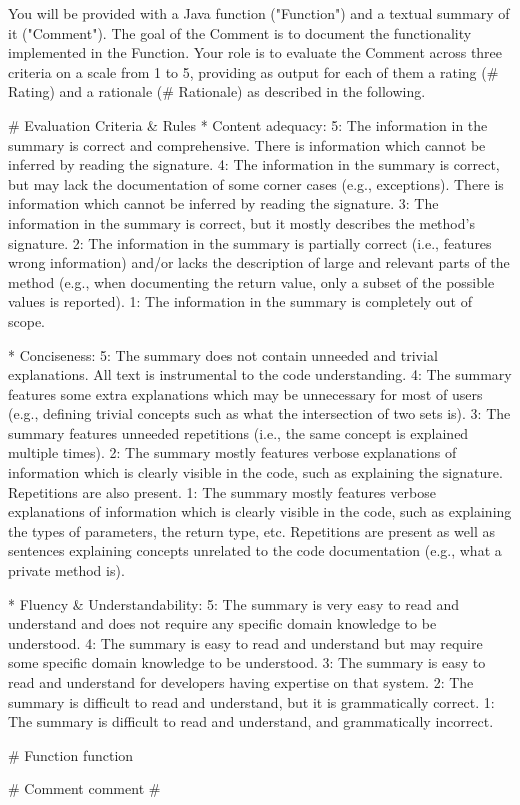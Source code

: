 You will be provided with a Java function ("Function") and a textual summary of it ("Comment"). The goal of the Comment is to document the functionality implemented in the Function. Your role is to evaluate the Comment across three criteria on a scale from 1 to 5, providing as output for each of them a rating (# Rating) and a rationale (# Rationale) as described in the following.

# Evaluation Criteria & Rules
* Content adequacy:
	5: The information in the summary is correct and comprehensive. There is information which cannot be inferred by reading the signature.
	4: The information in the summary is correct, but may lack the documentation of some corner cases (e.g., exceptions). There is information which cannot be inferred by reading the signature.
	3: The information in the summary is correct, but it mostly describes the method's signature.
	2: The information in the summary is partially correct (i.e., features wrong information) and/or lacks the description of large and relevant parts of the method (e.g., when documenting the return value, only a subset of the possible values is reported).
	1: The information in the summary is completely out of scope.

* Conciseness:
	5: The summary does not contain unneeded and trivial explanations. All text is instrumental to the code understanding.
	4: The summary features some extra explanations which may be unnecessary for most of users (e.g., defining trivial concepts such as what the intersection of two sets is).
	3: The summary features unneeded repetitions (i.e., the same concept is explained multiple times).
	2: The summary mostly features verbose explanations of information which is clearly visible in the code, such as explaining the signature. Repetitions are also present.
	1: The summary mostly features verbose explanations of information which is clearly visible in the code, such as explaining the types of parameters, the return type, etc. Repetitions are present as well as sentences explaining concepts unrelated to the code documentation (e.g., what a private method is).

* Fluency & Understandability:
	5: The summary is very easy to read and understand and does not require any specific domain knowledge to be understood.
	4: The summary is easy to read and understand but may require some specific domain knowledge to be understood.
	3: The summary is easy to read and understand for developers having expertise on that system.
	2: The summary is difficult to read and understand, but it is grammatically correct.
	1: The summary is difficult to read and understand, and grammatically incorrect.

# Function
{function}

# Comment
{comment}
#